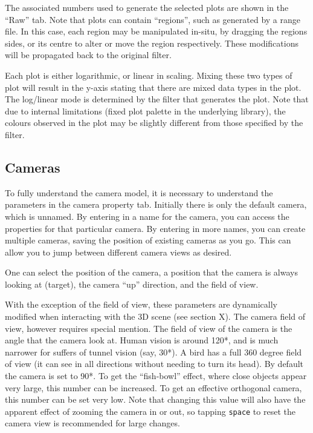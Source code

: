 \documentclass[10pt]{article}
\begin{document}
{The associated numbers used to generate the selected plots are shown in the ``Raw'' tab. Note that plots can contain ``regions'', such as generated by a range file. In this case, each region may be manipulated in-situ, by dragging the regions sides, or its centre to alter or move the region respectively. These modifications will be propagated back to the original filter.

Each plot is either logarithmic, or linear in scaling. Mixing these two types of plot will result in the y-axis stating that there are mixed data types in the plot. The log/linear mode is determined by the filter that generates the plot. Note that due to internal limitations (fixed plot palette in the underlying library), the colours observed in the plot may be slightly different from those specified by the filter.

\subsection{Cameras}
To fully understand the camera model, it is necessary to understand the parameters in the camera property tab. Initially there is only the default camera, which is unnamed. By entering in a name for the camera, you can access the properties for that particular camera. By entering in more names, you can create multiple cameras, saving the position of existing cameras as you go. This can allow you to jump between different camera views as desired.

One can select the position of the camera, a position that the camera is always looking at (target), the camera ``up'' direction, and the field of view.  

With the exception of the field of view, these parameters are dynamically modified when interacting with the 3D scene (see section X). The camera field of view, however requires special mention. The field of view of the camera is the angle that the camera look at. Human vision is around 120*, and is much narrower for suffers of tunnel vision (say, 30*). A bird has a full 360 degree field of view (it can see in all directions without needing to turn its head). By default the camera is set to 90*. To get the ``fish-bowl'' effect, where close objects appear very large, this number can be increased. To get an effective orthogonal camera, this number can be set very low. Note that changing this value will also have the apparent effect of zooming the camera in or out, so tapping \texttt{space} to reset the camera view is recommended for large changes. 

}
\end{document}
